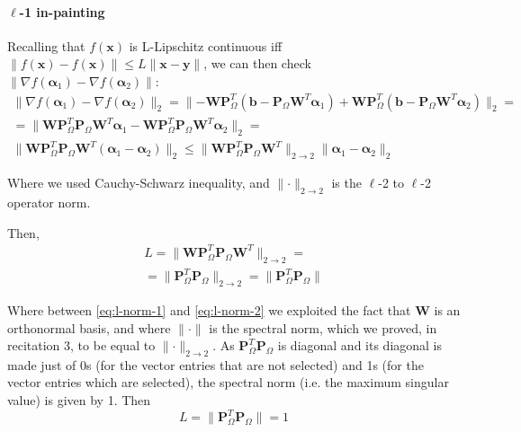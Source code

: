\documentclass[12pt]{article}
\begin{document}
\paragraph{\texorpdfstring{$\ell$}{Lg}-1 in-painting}
Recalling that $f(\mathbf{x})$ is L-Lipschitz continuous iff $\lVert f(\mathbf{x}) - f(\mathbf{x}) \rVert \leq L \lVert \mathbf{x} - \mathbf{y} \rVert$, we can then check $\lVert \nabla f(\bm{\alpha}_1) - \nabla f(\bm{\alpha}_2) \rVert$:
\begin{gather}
    \rVert \nabla f(\bm{\alpha}_1) - \nabla f(\bm{\alpha}_2) \rVert_2 = \lVert - \mathbf{W} \mathbf{P}_{\Omega}^T (\mathbf{b} - \mathbf{P}_{\Omega} \mathbf{W}^T \bm{\alpha}_1) + \mathbf{W} \mathbf{P}_{\Omega}^T (\mathbf{b} - \mathbf{P}_{\Omega} \mathbf{W} ^T \bm{\alpha}_2) \rVert_2 = \\
     = \lVert \mathbf{W} \mathbf{P}_{\Omega}^T \mathbf{P}_{\Omega} \mathbf{W}^T \bm{\alpha}_1 - \mathbf{W} \mathbf{P}_{\Omega}^T \mathbf{P}_{\Omega} \mathbf{W}^T \bm{\alpha}_2 \rVert_2 = \\
     \lVert \mathbf{W} \mathbf{P}_{\Omega}^T \mathbf{P}_{\Omega} \mathbf{W}^T (\bm{\alpha}_1 - \bm{\alpha}_2) \rVert_2 \leq \lVert \mathbf{W} \mathbf{P}_{\Omega}^T \mathbf{P}_{\Omega} \mathbf{W}^T \rVert_{2\rightarrow2} \lVert \bm{\alpha}_1 - \bm{\alpha}_2 \rVert_2
\end{gather}

Where we used Cauchy-Schwarz inequality, and $\lVert \cdot \rVert_{2\rightarrow2}$ is the $\ell$-2 to $\ell$-2 operator norm.

Then,
\begin{gather}
    L = \lVert \mathbf{W} \mathbf{P}_{\Omega}^T \mathbf{P}_{\Omega} \mathbf{W}^T \rVert_{2\rightarrow2} = \label{eq:l-norm-1} \\
    = \lVert \mathbf{P}_{\Omega}^T \mathbf{P}_{\Omega} \rVert_{2\rightarrow2} =
    \lVert \mathbf{P}_{\Omega}^T \mathbf{P}_{\Omega} \rVert \label{eq:l-norm-2}
\end{gather}

Where between \eqref{eq:l-norm-1} and \eqref{eq:l-norm-2} we exploited the fact that $\mathbf{W}$ is an orthonormal basis, and where $\lVert \cdot \rVert$ is the spectral norm, which we proved, in recitation 3, to be equal to $\lVert \cdot \rVert_{2\rightarrow2}$. As $\mathbf{P}_{\Omega}^T \mathbf{P}_{\Omega}$ is diagonal and its diagonal is made just of 0s (for the vector entries that are not selected) and 1s (for the vector entries which are selected), the spectral norm (i.e. the maximum singular value) is given by 1. Then
\begin{equation}
    L = \lVert \mathbf{P}_{\Omega}^T \mathbf{P}_{\Omega} \rVert = 1
\end{equation}
\end{document}
